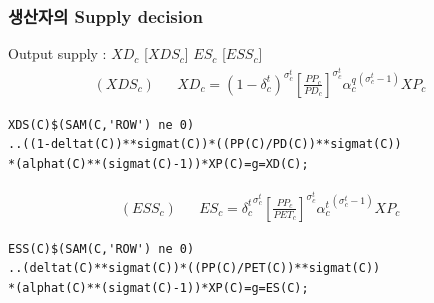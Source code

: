 \documentclass[10pt,compress,slidetop,%
			   hyperref={unicode},xcolor={svgnames},%
			   t]{beamer}
\begin{document}
\begin{frame}[fragile]
	\frametitle{생산자의 Supply decision}
\begin{scriptsize}
Output supply : $XD_c$ [$XDS_c$] $ES_c$ [$ESS_c$]
\begin{eqnarray*}
(XDS_c)& &XD_c={(1-\delta^t_c)}^{\sigma^t_c}\left[\frac{PP_c}{PD_c}\right]^{\sigma^t_c}{\alpha^q_c}^{(\sigma^t_c-1)}XP_c
\end{eqnarray*}


\begin{verbatim}
XDS(C)$(SAM(C,'ROW') ne 0)
..((1-deltat(C))**sigmat(C))*((PP(C)/PD(C))**sigmat(C))
*(alphat(C)**(sigmat(C)-1))*XP(C)=g=XD(C);
\end{verbatim}

\begin{eqnarray*}
(ESS_c)& &ES_c={\delta^t_c}^{\sigma^t_c}\left[\frac{PP_c}{PET_c}\right]^{\sigma^t_c}{\alpha^t_c}^{(\sigma^t_c-1)}XP_c
\end{eqnarray*}

\begin{verbatim}
ESS(C)$(SAM(C,'ROW') ne 0)
..(deltat(C)**sigmat(C))*((PP(C)/PET(C))**sigmat(C))
*(alphat(C)**(sigmat(C)-1))*XP(C)=g=ES(C);
\end{verbatim}

\end{scriptsize}
\end{frame}
\end{document}
